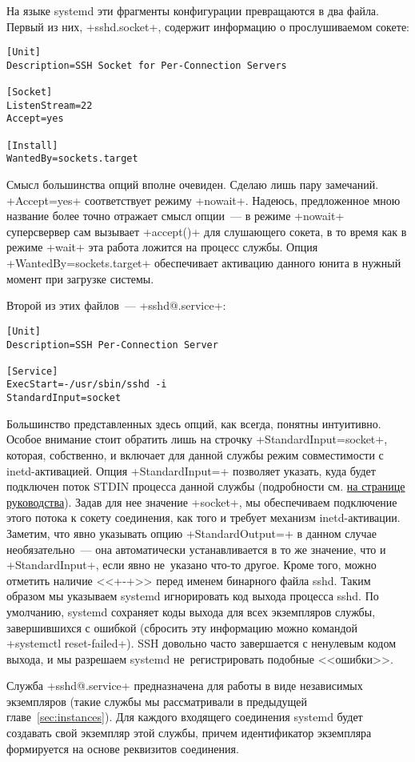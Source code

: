 \documentclass[10pt,oneside,a4paper]{article}
\begin{document}
На языке systemd эти фрагменты конфигурации превращаются в два файла. Первый из
них, +sshd.socket+, содержит информацию о прослушиваемом сокете:
\begin{Verbatim}
[Unit]
Description=SSH Socket for Per-Connection Servers

[Socket]
ListenStream=22
Accept=yes

[Install]
WantedBy=sockets.target
\end{Verbatim}

Смысл большинства опций вполне очевиден. Сделаю лишь пару замечаний.
+Accept=yes+ соответствует режиму +nowait+. Надеюсь, предложенное мною название
более точно отражает смысл опции~--- в режиме +nowait+ суперсвервер сам вызывает
+accept()+ для слушающего сокета, в то время как в режиме +wait+ эта работа
ложится на процесс службы. Опция +WantedBy=sockets.target+ обеспечивает
активацию данного юнита в нужный момент при загрузке системы.

Второй из этих файлов~--- +sshd@.service+:
\begin{Verbatim}
[Unit]
Description=SSH Per-Connection Server

[Service]
ExecStart=-/usr/sbin/sshd -i
StandardInput=socket
\end{Verbatim}

Большинство представленных здесь опций, как всегда, понятны интуитивно. Особое
внимание стоит обратить лишь на строчку +StandardInput=socket+, которая,
собственно, и включает для данной службы режим совместимости с inetd-активацией.
Опция +StandardInput=+ позволяет указать, куда будет подключен поток STDIN
процесса данной службы (подробности см.
\href{http://www.freedesktop.org/software/systemd/man/systemd.exec.html}%
{на странице руководства}). Задав для нее значение +socket+, мы обеспечиваем
подключение этого потока к сокету соединения, как того и требует механизм
inetd-активации. Заметим, что явно указывать опцию +StandardOutput=+ в данном
случае необязательно~--- она автоматически устанавливается в то же значение, что
и +StandardInput+, если явно не~указано что-то другое. Кроме того, можно
отметить наличие <<+-+>> перед именем бинарного файла sshd. Таким образом мы
указываем systemd игнорировать код выхода процесса sshd. По умолчанию, systemd
сохраняет коды выхода для всех экземпляров службы, завершившихся с ошибкой
(сбросить эту информацию можно командой +systemctl reset-failed+). SSH довольно
часто завершается с ненулевым кодом выхода, и мы разрешаем systemd
не~регистрировать подобные <<ошибки>>.

Служба +sshd@.service+ предназначена для работы в виде независимых экземпляров
(такие службы мы рассматривали в предыдущей главе~\ref{sec:instances}). Для
каждого входящего соединения systemd будет создавать свой экземпляр этой службы,
причем идентификатор экземпляра формируется на основе реквизитов соединения.
\end{document}
